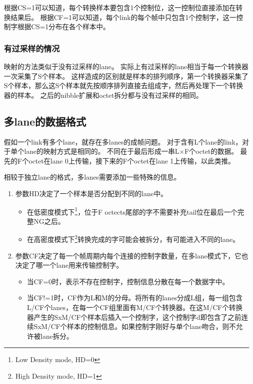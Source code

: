 \documentclass[UTF8]{ctexart}
\begin{document}
根据CS=1可以知道，每个转换样本要包含1个控制位，这一控制位直接添加在转换结果后。
根据CF=1可以知道，每个link的每个帧中只包含1个控制字，这一控制字根据CS=1分布在各个样本中。

\subsubsection{有过采样的情况}

映射的方法类似于没有过采样的lane。
实际上有过采样的lane相当于每一个转换器一次采集了S个样本。
这样造成的区别就是样本的排列顺序，第一个转换器采集了S个样本，那么这S个样本就先按顺序排列直接去组成字，然后再处理下一个转换器的样本。
之后的nibble扩展和octet拆分都与没有过采样的相同。

\subsection{多lane的数据格式}

假如一个link有多个lane，就存在多lanes的成帧问题。
对于含有L个lane的link，对于单个lane的映射方式是相同的。
不同在于最后形成一串L×F个octet的数据。
最先的F个octet在lane 0上传输，接下来的F个octet在lane 1上传输，以此类推。

相较于独立lane的格式，多lanes需要添加一些特殊的信息。
\begin{enumerate}
	\item 参数HD决定了一个样本是否分配到不同的lane中。
	\begin{itemize}
		\item 在低密度模式下\footnote{Low Density mode, HD=0}，位于F octects尾部的字不需要补充tail位在最后一个完整NG之后。
		\item 在高密度模式下\footnote{High Density mode, HD=1}转换完成的字可能会被拆分，有可能进入不同的lane。
	\end{itemize}
	\item 参数CF决定了每一个帧周期内每个连接的控制字数量，在多lane模式下，它也决定了哪一个lane用来传输控制字。
	\begin{itemize}
		\item 当CF=0时，表示不存在控制字，控制信息分散在每一个数据字中。
		\item 当CF!=1时，CF作为L和M的分母。将所有的lanes分成L组，每一组包含L/CF个lanes，在每一个CF组里面有M/CF个转换器。在这M/CF个转换器产生的SxM/CF个样本后插入一个控制字，这个控制字d即包含了之前连续SxM/CF个样本的控制信息。如果控制字刚好与单个lane吻合，则不允许被lane拆分。
	\end{itemize}
\end{enumerate}
\end{document}
